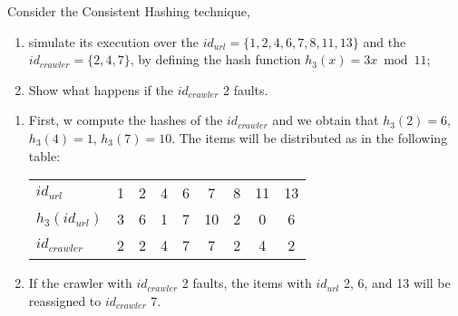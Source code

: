 \exercise

Consider the Consistent Hashing technique,
%
\begin{enumerate}

  \item simulate its execution over the $id_{url} = \{ 1, 2, 4, 6, 7, 8, 11,
  13 \}$ and the $id_{crawler} = \{ 2, 4, 7 \}$, by defining the hash function
  $h_3(x) = 3x \bmod 11$;

  \item Show what happens if the $id_{crawler}$ 2 faults.

\end{enumerate}

\solution

\begin{enumerate}

  \item First, w compute the hashes of the $id_{crawler}$ and we obtain that
  $h_3(2) = 6$, $h_3(4) = 1$, $h_3(7) = 10$. The items will be distributed as in
  the following table:
  \begin{table}[h]
    \centering
    \begin{tabular}{l|c|c|c|c|c|c|c|c}
      $id_{url}$      & 1 & 2 & 4 & 6 & 7 & 8 & 11 & 13 \\
      $h_3(id_{url})$ & 3 & 6 & 1 & 7 & 10 & 2 & 0 & 6 \\ \hline
      $id_{crawler}$  & 2 & 2 & 4 & 7 & 7 & 2 & 4 & 2 \\
    \end{tabular}
  \end{table}

  \item If the crawler with $id_{crawler}$ 2 faults, the items with $id_{url}$
  2, 6, and 13 will be reassigned to $id_{crawler}$ 7.

\end{enumerate}
